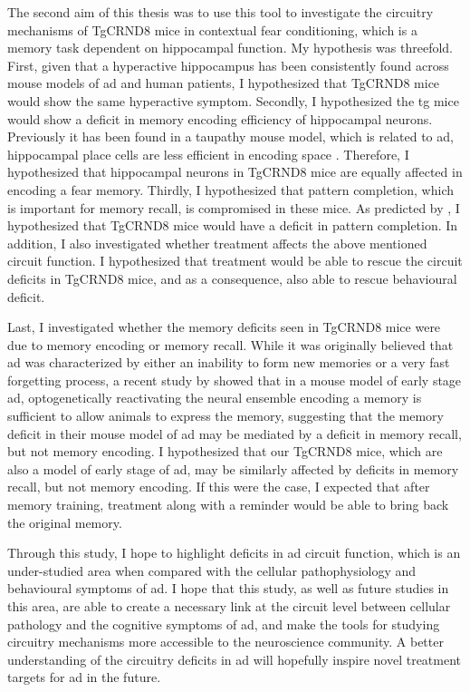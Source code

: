 The second aim of this thesis was to use this tool to investigate the circuitry mechanisms of TgCRND8 mice in contextual fear conditioning, which is a memory task dependent on hippocampal function. My hypothesis was threefold. First, given that a hyperactive hippocampus has been consistently found across mouse models of \gls{ad} and human patients, I hypothesized that TgCRND8 mice would show the same hyperactive symptom. Secondly, I hypothesized the \gls{tg} mice would show a deficit in memory encoding efficiency of hippocampal neurons. Previously it has been found in a taupathy mouse model, which is related to \gls{ad}, hippocampal place cells are less efficient in encoding space \citep{cheng13, ciupek15}. Therefore, I hypothesized that hippocampal neurons in TgCRND8 mice are equally affected in encoding a fear memory. Thirdly, I hypothesized that pattern completion, which is important for memory recall, is compromised in these mice. As predicted by \citet{horn93}, I hypothesized that TgCRND8 mice would have a deficit in pattern completion. In addition, I also investigated whether \tglu{} treatment affects the above mentioned circuit function. I hypothesized that \tglu{} treatment would be able to rescue the circuit deficits in TgCRND8 mice, and as a consequence, also able to rescue behavioural deficit. 

Last, I investigated whether the memory deficits seen in TgCRND8 mice were due to memory encoding or memory recall. While it was originally believed that \gls{ad} was characterized by either an inability to form new memories or a very fast forgetting process, a recent study by \citet{roy16} showed that in a mouse model of early stage \gls{ad}, optogenetically reactivating the neural ensemble encoding a memory is sufficient to allow animals to express the memory, suggesting that the memory deficit in their mouse model of \gls{ad} may be mediated by a deficit in memory recall, but not memory encoding. I hypothesized that our TgCRND8 mice, which are also a model of early stage of \gls{ad}, may be similarly affected by deficits in memory recall, but not memory encoding. If this were the case, I expected that after memory training, \tglu treatment along with a reminder would be able to bring back the original memory.

Through this study, I hope to highlight deficits in \gls{ad} circuit function, which is an under-studied area when compared with the cellular pathophysiology and behavioural symptoms of \gls{ad}. I hope that this study, as well as future studies in this area, are able to create a necessary link at the circuit level between cellular pathology and the cognitive symptoms of \gls{ad}, and make the tools for studying circuitry mechanisms more accessible to the neuroscience community. A better understanding of the circuitry deficits in \gls{ad} will hopefully inspire novel treatment targets for \gls{ad} in the future. 
